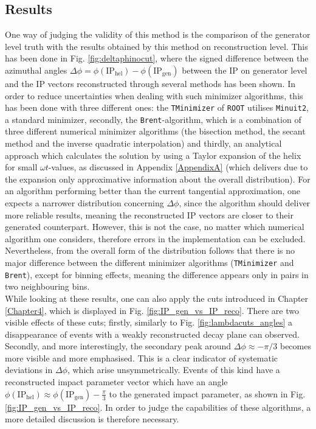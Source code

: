 \subsection{Results}
One way of judging the validity of this method is the comparison of the generator level truth with the results obtained by this method on reconstruction level. This has been done in Fig. \ref{fig:deltaphinocut}, where the signed difference between the azimuthal angles $\Delta\phi = \phi(\text{IP}_\text{hel})-\phi({\text{IP}_\text{gen}})$ between the IP on generator level and the IP vectors reconstructed through several methods has been shown. In order to reduce uncertainties when dealing with such minimizer algorithms, this has been done with three different ones: the \verb|TMinimizer| of \verb|ROOT| utilises \verb|Minuit2|, a standard minimizer, secondly, the \verb|Brent|-algorithm, which is a combination of three different numerical minimizer algorithms (the bisection method, the secant method and the inverse quadratic interpolation) and thirdly, an analytical approach which calculates the solution by using a Taylor expansion of the helix for small $\omega t$-values, as discussed in Appendix \ref{AppendixA} (which delivers due to the expansion only approximative information about the overall distribution).
For an algorithm performing better than the current tangential approximation, one expects a narrower distribution concerning $\Delta\phi$, since the algorithm should deliver more reliable results, meaning the reconstructed IP vectors are closer to their generated counterpart. However, this is not the case, no matter which numerical algorithm one considers, therefore errors in the implementation can be excluded. Nevertheless, from the overall form of the distribution follows that there is no major difference between the different minimizer algorithms (\verb|TMinimizer| and \verb|Brent|), except for binning effects, meaning the difference appears only in pairs in two neighbouring bins.\\
While looking at these results, one can also apply the cuts introduced in Chapter \ref{Chapter4}, which is displayed in Fig. \ref{fig:IP_gen_vs_IP_reco}. There are two visible effects of these cuts; firstly, similarly to Fig. \ref{fig:lambdacuts_angles} a disappearance of events with a weakly reconstructed decay plane can observed. Secondly, and more interestingly, the secondary peak around $\Delta\phi \approx -\pi/3$ becomes more visible and more emphasised. This is a clear indicator of systematic deviations in $\Delta\phi$, which arise unsymmetrically. Events of this kind have a reconstructed impact parameter vector which have an angle $\phi(\text{IP}_\text{hel}) \approx \phi(\text{IP}_\text{gen})-\frac{\pi}{3}$ to the generated impact parameter, as shown in Fig. \ref{fig:IP_gen_vs_IP_reco}. In order to judge the capabilities of these algorithms, a more detailed discussion is therefore necessary.
